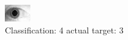 \begin{figure}[h!]
\begin{center}
\includegraphics[width=0.60\columnwidth]{figures/ID1882_class_4_target_3.png}
\end{center}
\caption{ Classification: 4 actual target: 3}
\label{fig:ID1882_class_4_target_3}
\end{figure}
